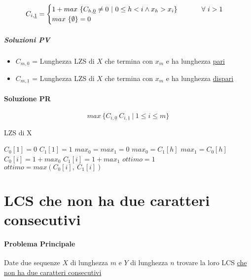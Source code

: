 \documentclass[12pt]{article}
\begin{document}
\[
    C_{i, \underline{1}}=\begin{cases}
        1 + max \ \{C_{h, \underline{0}}\neq 0 \ | \ 0\leq h<i \land x_h>x_i\}$ \hspace{1cm} $\forall \ i>1 \\
        max \ \{\emptyset\} = 0
    \end{cases}
\]
\subparagraph{Soluzioni PV}
\begin{itemize}
    \item $C_{m, \underline{0}}$ = Lunghezza LZS di $X$ che termina con $x_m$ e ha lunghezza \underline{pari}
    \item $C_{m, \underline{1}}$ = Lunghezza LZS di $X$ che termina con $x_m$ e ha lunghezza \underline{dispari}
\end{itemize}
\paragraph{Soluzione PR}
$$max \ \{C_{i,\underline{0}} \ C_{i,\underline{1}} \ | \ 1 \leq i \leq m\}$$
\newpage
\begin{algorithm}
    \caption{LZS di X}
    \begin{algorithmic}
        \STATE $C_{0}[1]=0$
        \STATE $C_{1}[1]=1$
        \STATE $max_0=max_1=0$
        \STATE $max_0=C_1[h]$
        \ENDIF
        \STATE $max_1=C_0[h]$
        \ENDIF
        \ENDFOR
        \STATE $C_0[i]=1+max_0$
        \ENDIF
        \STATE $C_1[i]=1+max_1$
        \ENDFOR
        \STATE $ottimo=1$
        \STATE $ottimo = max(C_0[i], \ C_1[i])$
        \ENDIF
        \ENDFOR
    \end{algorithmic}
\end{algorithm}
\newpage

\section{LCS che non ha due caratteri consecutivi}
\paragraph{Problema Principale}
Date due sequenze $X$ di lunghezza $m$ e $Y$ di lunghezza $n$ trovare la loro LCS \underline{che non ha due caratteri consecutivi}
\end{document}
